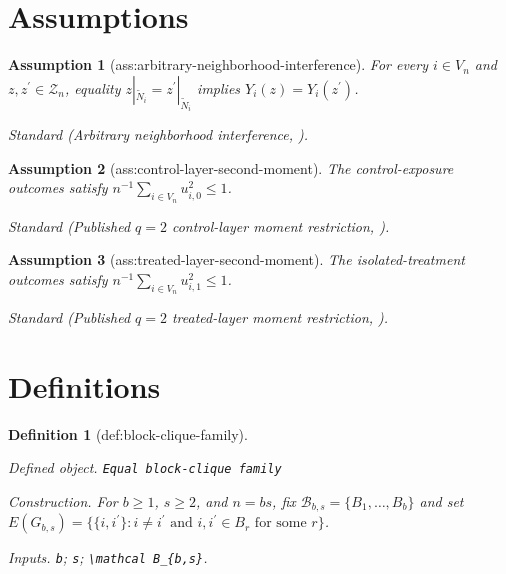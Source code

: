\documentclass{article}
\newtheorem{assumption}{Assumption}
\newtheorem{definition}{Definition}
\begin{document}
\section{Assumptions}

\begin{assumption}[ass:arbitrary-neighborhood-interference]\label{ass:arbitrary-neighborhood-interference}
For every \(i\in V_n\) and \(z,z^{\prime}\in\mathcal Z_n\), equality \(z|_{\widetilde N_i}=z^{\prime}|_{\widetilde N_i}\) implies \(Y_i(z)=Y_i(z^{\prime})\).
\par\smallskip\noindent\emph{Standard} (Arbitrary neighborhood interference, \cite{KandirosHarshawSavje2026}).
\end{assumption}

\begin{assumption}[ass:control-layer-second-moment]\label{ass:control-layer-second-moment}
The control-exposure outcomes satisfy \(n^{-1}\sum_{i\in V_n}u_{i,0}^2\le1\).
\par\smallskip\noindent\emph{Standard} (Published \(q=2\) control-layer moment restriction, \cite{KandirosHarshawSavje2026}).
\end{assumption}

\begin{assumption}[ass:treated-layer-second-moment]\label{ass:treated-layer-second-moment}
The isolated-treatment outcomes satisfy \(n^{-1}\sum_{i\in V_n}u_{i,1}^2\le1\).
\par\smallskip\noindent\emph{Standard} (Published \(q=2\) treated-layer moment restriction, \cite{KandirosHarshawSavje2026}).
\end{assumption}

\section{Definitions}

\begin{definition}[def:block-clique-family]\label{def:block-clique-family}
\par\smallskip\noindent\emph{Defined object.} \texttt{Equal block-\allowbreak{}clique family}
\par\smallskip\noindent\emph{Construction.} For \(b\ge1\), \(s\ge2\), and \(n=bs\), fix \(\mathcal B_{b,s}=\{B_1,\ldots,B_b\}\) and set \(E(G_{b,s})=\{\{i,i^{\prime}\}:i\ne i^{\prime}\text{ and }i,i^{\prime}\in B_r\text{ for some }r\}\).
\par\smallskip\noindent\emph{Inputs.} \texttt{b}; \texttt{s}; \texttt{\textbackslash{}\allowbreak{}mathcal B\_\allowbreak{}\{b,\allowbreak{}s\}\allowbreak{}}.
\end{definition}
\end{document}
